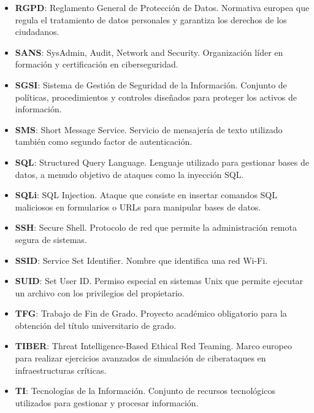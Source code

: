\documentclass[a4paper, 11pt]{article}
\begin{document}
\begin{itemize}
    \item \textbf{RGPD}: Reglamento General de Protección de Datos. Normativa europea que regula el tratamiento de datos personales y garantiza los derechos de los ciudadanos.

    \item \textbf{SANS}: SysAdmin, Audit, Network and Security. Organización líder en formación y certificación en ciberseguridad.

    \item \textbf{SGSI}: Sistema de Gestión de Seguridad de la Información. Conjunto de políticas, procedimientos y controles diseñados para proteger los activos de información.

    \item \textbf{SMS}: Short Message Service. Servicio de mensajería de texto utilizado también como segundo factor de autenticación.

    \item \textbf{SQL}: Structured Query Language. Lenguaje utilizado para gestionar bases de datos, a menudo objetivo de ataques como la inyección SQL.

    \item \textbf{SQLi}: SQL Injection. Ataque que consiste en insertar comandos SQL maliciosos en formularios o URLs para manipular bases de datos.

    \item \textbf{SSH}: Secure Shell. Protocolo de red que permite la administración remota segura de sistemas.

    \item \textbf{SSID}: Service Set Identifier. Nombre que identifica una red Wi-Fi.

    \item \textbf{SUID}: Set User ID. Permiso especial en sistemas Unix que permite ejecutar un archivo con los privilegios del propietario.

    \item \textbf{TFG}: Trabajo de Fin de Grado. Proyecto académico obligatorio para la obtención del título universitario de grado.

    \item \textbf{TIBER}: Threat Intelligence-Based Ethical Red Teaming. Marco europeo para realizar ejercicios avanzados de simulación de ciberataques en infraestructuras críticas.

    \item \textbf{TI}: Tecnologías de la Información. Conjunto de recursos tecnológicos utilizados para gestionar y procesar información.


\end{itemize}
\end{document}
